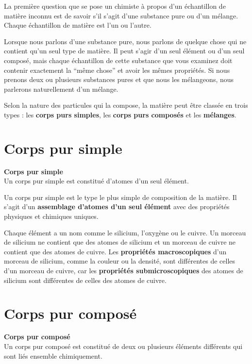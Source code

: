 \documentclass[
  11pt,
  a4paper,
  openany]{book}
\begin{document}
La première question que se pose un chimiste à propos d'un échantillon de matière inconnu est de savoir s'il s'agit d'une substance pure ou d'un mélange. Chaque échantillon de matière est l'un ou l'autre.

Lorsque nous parlons d'une substance pure, nous parlons de quelque chose qui ne contient qu'un seul type de matière. Il peut s'agir d'un seul élément ou d'un seul composé, mais chaque échantillon de cette substance que vous examinez doit contenir exactement la ``même chose'' et avoir les mêmes propriétés. Si nous prenons deux ou plusieurs substances pures et que nous les mélangeons, nous parlerons naturellement d'un mélange.

Selon la nature des particules qui la compose, la matière peut être classée en trois types : les \textbf{corps purs simples}, les \textbf{corps purs composés} et les \textbf{mélanges}.

\section{Corps pur simple}\label{corps-pur-simple}

\begin{tcolorbox}
\textbf{Corps pur simple}\\
Un corps pur simple est constitué d'atomes d'un seul élément.

\end{tcolorbox}

Un corps pur simple est le type le plus simple de composition de la matière. Il s'agit d'un \textbf{assemblage d'atomes d'un seul élément} avec des propriétés physiques et chimiques uniques.

Chaque élément a un nom comme le silicium, l'oxygène ou le cuivre. Un morceau de silicium ne contient que des atomes de silicium et un morceau de cuivre ne contient que des atomes de cuivre. Les \textbf{propriétés macroscopiques} d'un morceau de silicium, comme la couleur ou la densité, sont différentes de celles d'un morceau de cuivre, car les \textbf{propriétés submicroscopiques} des atomes de silicium sont différentes de celles des atomes de cuivre.

\section{Corps pur composé}\label{corps-pur-composuxe9}

\begin{tcolorbox}
\textbf{Corps pur composé}\\
Un corps pur composé est constitué de deux ou plusieurs éléments différents qui sont liés ensemble chimiquement.

\end{tcolorbox}
\end{document}
